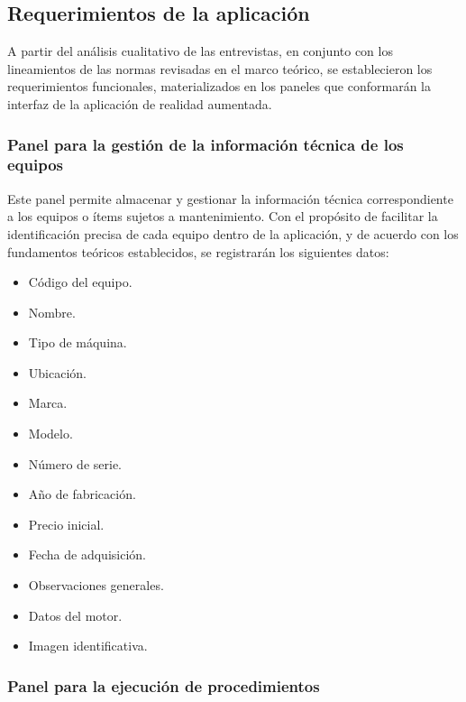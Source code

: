                 

    \subsection{Requerimientos de la aplicación}

        A partir del análisis cualitativo de las entrevistas, en conjunto con los lineamientos de las normas revisadas en el marco teórico, se establecieron los requerimientos funcionales, materializados en los paneles que conformarán la interfaz de la aplicación de realidad aumentada.

        \subsubsection{Panel para la gestión de la información técnica de los equipos}

            Este panel permite almacenar y gestionar la información técnica correspondiente a los equipos o ítems sujetos a mantenimiento. Con el propósito de facilitar la identificación precisa de cada equipo dentro de la aplicación, y de acuerdo con los fundamentos teóricos establecidos, se registrarán los siguientes datos:

            \begin{itemize}
                \item Código del equipo.
                \item Nombre.
                \item Tipo de máquina.
                \item Ubicación.
                \item Marca.
                \item Modelo.
                \item Número de serie.
                \item Año de fabricación.
                \item Precio inicial.
                \item Fecha de adquisición.
                \item Observaciones generales.
                \item Datos del motor.
                \item Imagen identificativa.
            \end{itemize}

        \subsubsection{Panel para la ejecución de procedimientos}

